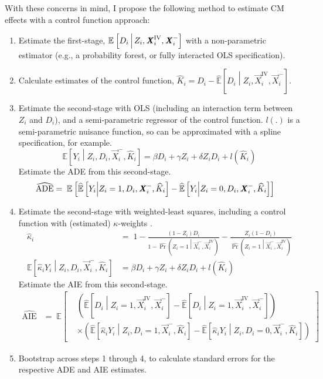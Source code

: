 With these concerns in mind, I propose the following method to estimate CM effects with a control function approach:
\begin{enumerate}
    \item Estimate the first-stage, $\mathbb{E}_{} \left[ D_i \, \middle\vert \, Z_i, \boldsymbol{\mathit{X}}_i^{\text{IV}}, \boldsymbol{\mathit{X}}_i^- \right]$ with a non-parametric estimator (e.g., a probability forest, or fully interacted OLS specification).
    \item Calculate estimates of the control function, $\hat K_i = D_i - \hat{\mathbb E} \left[D_i \middle\vert Z_i, \vec X_i^{\text{IV}}, \vec X_i^- \right]$.
    \item Estimate the second-stage with OLS (including an interaction term between $Z_i$ and $D_i$), and a semi-parametric regressor of the control function.
    $l(.)$ is a semi-parametric nuisance function, so can be approximated with a spline specification, for example.
    \[ \mathbb{E} \left[Y_i \middle\vert Z_i, D_i, \vec X_i^-, \hat K_i \right]
    = \beta D_i + \gamma Z_i + \delta Z_i D_i + l\left( \hat K_i \right) \]
    Estimate the ADE from this second-stage.
    \begin{align*}
        \widehat{\text{ADE}} &= \; \mathbb{E}_{} \left[ 
            \widehat{\mathbb{E}} \left[ Y_i \middle\vert Z_i = 1, D_i, \boldsymbol{\mathit{X}}_i^-, \widehat{K}_i \right]
            - \widehat{\mathbb{E}} \left[ Y_i \middle\vert Z_i = 0, D_i, \boldsymbol{\mathit{X}}_i^-, \widehat{K}_i \right] \right] 
    \end{align*}
    \item Estimate the second-stage with weighted-least squares, including a control function with (estimated) $\kappa$-weights \citep{abadie2003semiparametric}.
    \begin{align*}
        \hat\kappa_i &= \; 1 - \frac{(1 - Z_i)D_i}{
            1 - \hat\Pr\left(Z_i = 1 \middle\vert \vec X_i^-, \vec X_i^{\text{IV}}\right)} -
            \frac{Z_i (1 - D_i)}{
            \hat\Pr\left(Z_i = 1 \middle\vert \vec X_i^-, \vec X_i^{\text{IV}}\right)} \\
        \mathbb{E} \left[ \hat\kappa_i Y_i \middle\vert Z_i, D_i, \vec X_i^-, \hat K_i \right]
            &= \beta D_i + \gamma Z_i + \delta Z_i D_i + l\left( \hat K_i \right)
    \end{align*}
    Estimate the AIE from this second-stage.
    \begin{align*}
        \hat{\text{AIE}} &= \; \mathbb E \left[ \begin{aligned} &\left(
            \hat{\mathbb{E}} \left[D_i \middle\vert Z_i = 1, \vec X_i^{\text{IV}}, \vec X_i^-\right]
            - \hat{\mathbb{E}} \left[D_i \middle\vert Z_i = 1, \vec X_i^{\text{IV}}, \vec X_i^-\right] \right) \\
            &\times \left(
                \hat{\mathbb{E}} \left[ \hat\kappa_i Y_i \middle\vert Z_i, D_i = 1, \vec X_i^-, \hat K_i \right]
            - \hat{\mathbb{E}} \left[ \hat\kappa_i Y_i \middle\vert Z_i, D_i = 0, \vec X_i^-, \hat K_i \right]
            \right) \end{aligned} \right]
        \end{align*}
    \item Bootstrap across steps 1 through 4, to calculate standard errors for the respective ADE and AIE estimates.
\end{enumerate}

